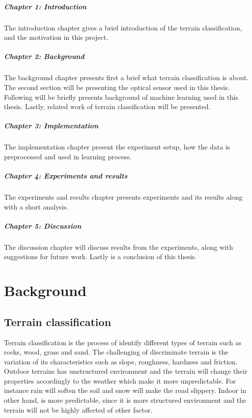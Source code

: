 \documentclass[USenglish]{ifimaster}  %
\begin{document}
\paragraph{Chapter 1: Introduction}
The introduction chapter gives a brief introduction of the terrain classification, and the motivation in this project.

\paragraph{Chapter 2: Background}
The background chapter presents first a brief what terrain classification is about. The second section will be presenting the optical sensor used in this thesis. Following will be briefly presents background of machine learning used in this thesis. Lastly, related work of terrain classification will be presented.

\paragraph{Chapter 3: Implementation}
The implementation chapter present the experiment setup, how the data is preprocessed and used in learning process.

\paragraph{Chapter 4: Experiments and results}
The experiments and results chapter presents experiments and its results along with a short analysis.

\paragraph{Chapter 5: Discussion}
The discussion chapter will discuss results from the experiments, along with suggestions for future work. Lastly is a conclusion of this thesis. 


\chapter{Background}                  %
\section{Terrain classification}
Terrain classification is the process of identify different types of terrain such as rocks, wood, grass and sand. The challenging of discriminate terrain is the variation of its characteristics such as slope, roughness, hardness and friction. Outdoor terrains has unstructured environment and the terrain will change their properties accordingly to the weather which make it more unpredictable. For instance rain will soften the soil and snow will make the road slippery. Indoor in other hand, is more predictable, since it is more structured environment and the terrain will not be highly affected of other factor.
\end{document}
